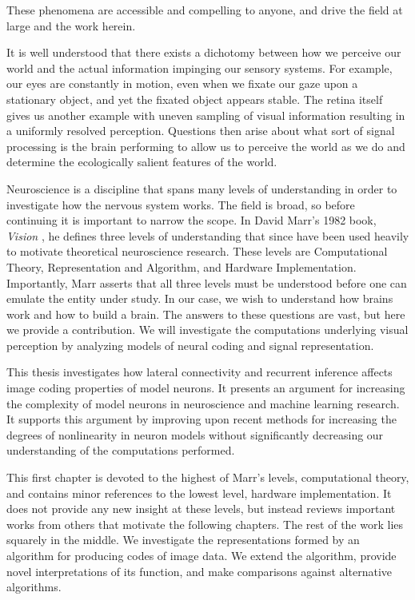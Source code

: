 These phenomena are accessible and compelling to anyone, and drive the field at large and the work herein.

It is well understood that there exists a dichotomy between how we perceive our world and the actual information impinging our sensory systems. For example, our eyes are constantly in motion, even when we fixate our gaze upon a stationary object, and yet the fixated object appears stable. The retina itself gives us another example with uneven sampling of visual information resulting in a uniformly resolved perception. Questions then arise about what sort of signal processing is the brain performing to allow us to perceive the world as we do and determine the ecologically salient features of the world. 

Neuroscience is a discipline that spans many levels of understanding in order to investigate how the nervous system works. The field is broad, so before continuing it is important to narrow the scope. In David Marr's 1982 book, \textit{Vision} \cite{marr1982vision}, he defines three levels of understanding that since have been used heavily to motivate theoretical neuroscience research. These levels are Computational Theory, Representation and Algorithm, and Hardware Implementation. Importantly, Marr asserts that all three levels must be understood before one can emulate the entity under study. In our case, we wish to understand how brains work and how to build a brain. The answers to these questions are vast, but here we provide a contribution. We will investigate the computations underlying visual perception by analyzing models of neural coding and signal representation.

This thesis investigates how lateral connectivity and recurrent inference affects image coding properties of model neurons. It presents an argument for increasing the complexity of model neurons in neuroscience and machine learning research. It supports this argument by improving upon recent methods for increasing the degrees of nonlinearity in neuron models without significantly decreasing our understanding of the computations performed.

This first chapter is devoted to the highest of Marr's levels, computational theory, and contains minor references to the lowest level, hardware implementation. It does not provide any new insight at these levels, but instead reviews important works from others that motivate the following chapters. The rest of the work lies squarely in the middle. We investigate the representations formed by an algorithm for producing codes of image data. We extend the algorithm, provide novel interpretations of its function, and make comparisons against alternative algorithms.

